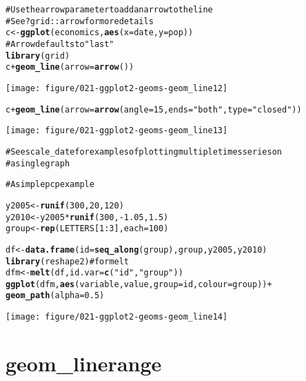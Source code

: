 \documentclass[a4paper,titlepage]{tufte-handout}\usepackage{graphicx, color}
\makeatletter
\def\maxwidth{ %
  \ifdim\Gin@nat@width>\linewidth
    \linewidth
  \else
    \Gin@nat@width
  \fi
}
\newcommand{\hlfunctioncall}[1]{\textcolor[rgb]{0.501960784313725,0,0.329411764705882}{\textbf{#1}}}%
\newcommand{\hlstring}[1]{\textcolor[rgb]{0.6,0.6,1}{#1}}%
\newcommand{\hlcomment}[1]{\textcolor[rgb]{0.180392156862745,0.6,0.341176470588235}{#1}}%
\newenvironment{kframe}{%
 \def\at@end@of@kframe{}%
 \ifinner\ifhmode%
  \def\at@end@of@kframe{\end{minipage}}%
  \begin{minipage}{\columnwidth}%
 \fi\fi%
 \def\FrameCommand##1{\hskip\@totalleftmargin \hskip-\fboxsep
 \colorbox{shadecolor}{##1}\hskip-\fboxsep
     \hskip-\linewidth \hskip-\@totalleftmargin \hskip\columnwidth}%
 \MakeFramed {\advance\hsize-\width
   \@totalleftmargin\z@ \linewidth\hsize
   \@setminipage}}%
 {\par\unskip\endMakeFramed%
 \at@end@of@kframe}
\newenvironment{knitrout}{}{} %
\makeatother
\begin{document}
\begin{knitrout}
\begin{kframe}
\begin{alltt}
\hlcomment{# Use the arrow parameter to add an arrow to the line}
\hlcomment{# See ?grid::arrow for more details}
c <- \hlfunctioncall{ggplot}(economics, \hlfunctioncall{aes}(x = date, y = pop))
\hlcomment{# Arrow defaults to "last"}
\hlfunctioncall{library}(grid)
c + \hlfunctioncall{geom_line}(arrow = \hlfunctioncall{arrow}())
\end{alltt}
\end{kframe}
\texttt{[image: figure/021-ggplot2-geoms-geom\_line12]} 
\begin{kframe}\begin{alltt}
c + \hlfunctioncall{geom_line}(arrow = \hlfunctioncall{arrow}(angle = 15, ends = \hlstring{"both"}, type = \hlstring{"closed"}))
\end{alltt}
\end{kframe}
\texttt{[image: figure/021-ggplot2-geoms-geom\_line13]} 
\begin{kframe}\begin{alltt}

\hlcomment{# See scale_date for examples of plotting multiple times series on}
\hlcomment{# a single graph}

\hlcomment{# A simple pcp example}

y2005 <- \hlfunctioncall{runif}(300, 20, 120)
y2010 <- y2005 * \hlfunctioncall{runif}(300, -1.05, 1.5)
group <- \hlfunctioncall{rep}(LETTERS[1:3], each = 100)

df <- \hlfunctioncall{data.frame}(id = \hlfunctioncall{seq_along}(group), group, y2005, y2010)
\hlfunctioncall{library}(reshape2) \hlcomment{# for melt}
dfm <- \hlfunctioncall{melt}(df, id.var = \hlfunctioncall{c}(\hlstring{"id"}, \hlstring{"group"}))
\hlfunctioncall{ggplot}(dfm, \hlfunctioncall{aes}(variable, value, group = id, colour = group)) +
  \hlfunctioncall{geom_path}(alpha = 0.5)
\end{alltt}
\end{kframe}
\texttt{[image: figure/021-ggplot2-geoms-geom\_line14]} 
\begin{kframe}\begin{alltt}


\end{alltt}
\end{kframe}
\end{knitrout}



\section{geom\_linerange}
\end{document}
